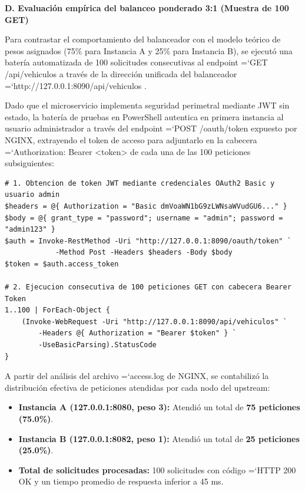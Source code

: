 \documentclass[11pt,a4paper]{article}
\renewcommand{\_}{\oldunderscore\allowbreak}
\DeclareRobustCommand{\texttt}[1]{%
  {\upshape\ttfamily\fontsize{9}{10.8}\selectfont\hyphenchar\font=`\-\relax #1}%
}
\begin{document}
\vspace{0.2cm}
\noindent\textbf{D. Evaluación empírica del balanceo ponderado 3:1 (Muestra de 100 GET)}

\noindent Para contrastar el comportamiento del balanceador con el modelo teórico de pesos asignados (75\% para Instancia A y 25\% para Instancia B), se ejecutó una batería automatizada de 100 solicitudes consecutivas al endpoint \texttt{GET /\allowbreak{}api/\allowbreak{}vehiculos} a través de la dirección unificada del balanceador \texttt{http:\allowbreak{}/\allowbreak{}/\allowbreak{}127.\allowbreak{}0.\allowbreak{}0.\allowbreak{}1:\allowbreak{}8090/\allowbreak{}api/\allowbreak{}vehiculos}. 

\vspace{0.15cm}
\noindent Dado que el microservicio implementa seguridad perimetral mediante JWT sin estado, la batería de pruebas en PowerShell autentica en primera instancia al usuario administrador a través del endpoint \texttt{POST /\allowbreak{}oauth/\allowbreak{}token} expuesto por NGINX, extrayendo el token de acceso para adjuntarlo en la cabecera \texttt{Authorization: Bearer <token>} de cada una de las 100 peticiones subsiguientes:

\begin{lstlisting}
# 1. Obtencion de token JWT mediante credenciales OAuth2 Basic y usuario admin
$headers = @{ Authorization = "Basic dmVoaWN1bG9zLWNsaWVudGU6..." }
$body = @{ grant_type = "password"; username = "admin"; password = "admin123" }
$auth = Invoke-RestMethod -Uri "http://127.0.0.1:8090/oauth/token" `
            -Method Post -Headers $headers -Body $body
$token = $auth.access_token

# 2. Ejecucion consecutiva de 100 peticiones GET con cabecera Bearer Token
1..100 | ForEach-Object {
    (Invoke-WebRequest -Uri "http://127.0.0.1:8090/api/vehiculos" `
        -Headers @{ Authorization = "Bearer $token" } `
        -UseBasicParsing).StatusCode
}
\end{lstlisting}

\vspace{0.1cm}
\noindent A partir del análisis del archivo \texttt{access.log} de NGINX, se contabilizó la distribución efectiva de peticiones atendidas por cada nodo del upstream:
\begin{itemize}[leftmargin=*,itemsep=2pt,topsep=1pt]
  \item \textbf{Instancia A (127.0.0.1:8080, peso 3):} Atendió un total de \textbf{75 peticiones (75.0\%)}.
  \item \textbf{Instancia B (127.0.0.1:8082, peso 1):} Atendió un total de \textbf{25 peticiones (25.0\%)}.
  \item \textbf{Total de solicitudes procesadas:} 100 solicitudes con código \texttt{HTTP 200 OK} y un tiempo promedio de respuesta inferior a 45 ms.
\end{itemize}
\end{document}
